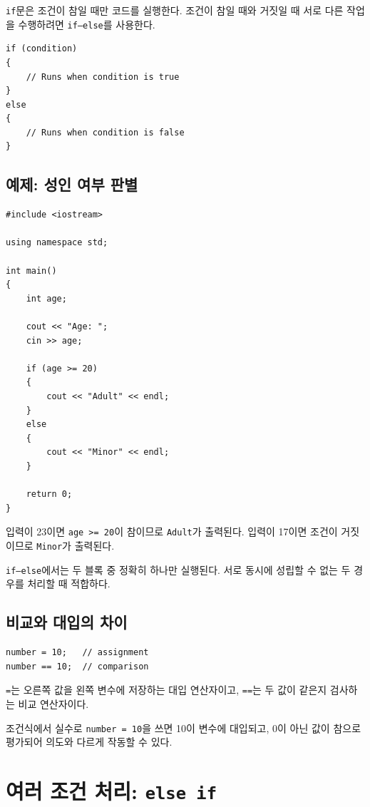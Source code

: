 \documentclass[11pt,a4paper]{article}
\begin{document}
\texttt{if}문은 조건이 참일 때만 코드를 실행한다.
조건이 참일 때와 거짓일 때 서로 다른 작업을 수행하려면 \texttt{if--else}를 사용한다.

\begin{lstlisting}
if (condition)
{
    // Runs when condition is true
}
else
{
    // Runs when condition is false
}
\end{lstlisting}

\subsection{예제: 성인 여부 판별}

\begin{lstlisting}
#include <iostream>

using namespace std;

int main()
{
    int age;

    cout << "Age: ";
    cin >> age;

    if (age >= 20)
    {
        cout << "Adult" << endl;
    }
    else
    {
        cout << "Minor" << endl;
    }

    return 0;
}
\end{lstlisting}

입력이 23이면 \texttt{age >= 20}이 참이므로 \texttt{Adult}가 출력된다.
입력이 17이면 조건이 거짓이므로 \texttt{Minor}가 출력된다.

\begin{importantbox}
\texttt{if--else}에서는 두 블록 중 정확히 하나만 실행된다.
서로 동시에 성립할 수 없는 두 경우를 처리할 때 적합하다.
\end{importantbox}

\subsection{비교와 대입의 차이}

\begin{lstlisting}
number = 10;   // assignment
number == 10;  // comparison
\end{lstlisting}

\texttt{=}는 오른쪽 값을 왼쪽 변수에 저장하는 대입 연산자이고,
\texttt{==}는 두 값이 같은지 검사하는 비교 연산자이다.

조건식에서 실수로 \texttt{number = 10}을 쓰면 10이 변수에 대입되고,
0이 아닌 값이 참으로 평가되어 의도와 다르게 작동할 수 있다.

\section{여러 조건 처리: \texttt{else if}}
\end{document}
